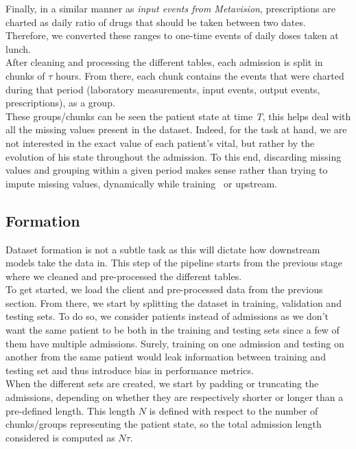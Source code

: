 Finally, in a similar manner as \textit{input events from Metavision}, prescriptions are charted as daily ratio of drugs that should be taken between two dates. Therefore, we converted these ranges to one-time events of daily doses taken at lunch. \\

After cleaning and processing the different tables, each admission is split in chunks of $\tau$ hours. From there, each chunk contains the events that were charted during that period (laboratory measurements, input events, output events, prescriptions), as a group. \\

These groups/chunks can be seen the patient state at time \emph{T}, this helps deal with all the missing values present in the dataset. Indeed, for the task at hand, we are not interested in the exact value of each patient's vital, but rather by the evolution of his state throughout the admission. To this end, discarding missing values and grouping within a given period makes sense rather than trying to impute missing values, dynamically while training~\cite{Che2018} or upstream.

\newpage
\subsection{Formation}
\label{sec:Formation}
Dataset formation is not a subtle task as this will dictate how downstream models take the data in. This step of the pipeline starts from the previous stage where we cleaned and pre-processed the different tables.\\

To get started, we load the client and pre-processed data from the previous section. From there, we start by splitting the dataset in training, validation and testing sets. To do so, we consider patients instead of admissions as we don't want the same patient to be both in the training and testing sets since a few of them have multiple admissions. Surely, training on one admission and testing on another from the same patient would leak information between training and testing set and thus introduce bias in performance metrics. \\

When the different sets are created, we start by padding or truncating the admissions, depending on whether they are respectively shorter or longer than a pre-defined length. This length $N$ is defined with respect to the number of chunks/groups representing the patient state, so the total admission length considered is computed as $N\tau$. \\

